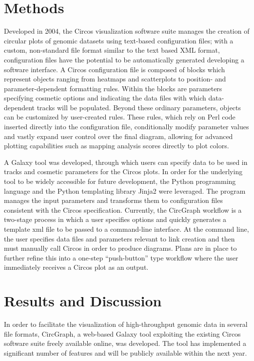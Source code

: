 \documentclass[twocolumn]{article}
\newcommand{\projectName}{CircGraph\xspace}
\begin{document}
\section*{Methods}
Developed in 2004, the Circos visualization software suite manages the creation of circular plots of genomic datasets using text-based configuration files; with a custom, non-standard file format similar to the text based XML format, configuration files have the potential to be automatically generated developing a software interface. A Circos configuration file is composed of blocks which represent objects ranging from heatmaps and scatterplots to position- and parameter-dependent formatting rules. Within the blocks are parameters specifying cosmetic options and indicating the data files with which data-dependent tracks will be populated. Beyond these ordinary parameters, objects can be customized by user-created rules. These rules, which rely on Perl code inserted directly into the configuration file, conditionally modify parameter values and vastly expand user control over the final diagram, allowing for advanced plotting capabilities such as mapping analysis scores directly to plot colors. \cite{circospaper}

A Galaxy tool was developed, through which users can specify data to be used in tracks and cosmetic parameters for the Circos plots. In order for the underlying tool to be widely accessible for future development, the Python programming language and the Python templating library Jinja2 were leveraged. The program manages the input parameters and transforms them to configuration files consistent with the Circos specification. Currently, the \projectName workflow is a two-stage process in which a user specifies options and quickly generates a template xml file to be passed to a command-line interface. At the command line, the user specifies data files and parameters relevant to link creation and then must manually call Circos in order to produce diagrams. Plans are in place to further refine this into a one-step ``push-button'' type workflow where the user immediately receives a Circos plot as an output.

\section*{Results and Discussion}

In order to facilitate the visualization of high-throughput genomic data in several file formats, \projectName, a web-based Galaxy tool exploiting the existing Circos software suite freely available online, was developed. The tool has implemented a significant number of features and will be publicly available within the next year. %
\end{document}
